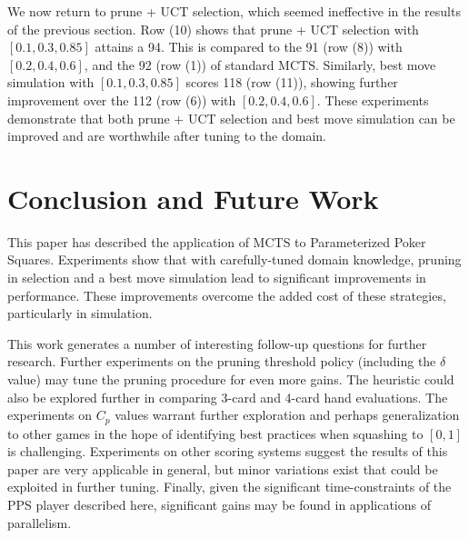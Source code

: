 \documentclass[letterpaper]{article}
\begin{document}
We now return to prune + UCT selection, which seemed ineffective in the results of the previous section. Row (10) shows that prune + UCT selection with $[0.1, 0.3, 0.85]$ attains a 94. This is compared to the 91 (row (8)) with $[0.2, 0.4, 0.6]$, and the 92 (row (1)) of standard MCTS. Similarly, best move simulation with $[0.1, 0.3, 0.85]$ scores 118 (row (11)), showing further improvement over the 112 (row (6)) with $[0.2, 0.4, 0.6]$. These experiments demonstrate that both prune + UCT selection and best move simulation can be improved and are worthwhile after tuning to the domain.




\section{Conclusion and Future Work}

This paper has described the application of MCTS to Parameterized Poker Squares. Experiments show that with carefully-tuned domain knowledge, pruning in selection and a best move simulation lead to significant improvements in performance. These improvements overcome the added cost of these strategies, particularly in simulation.

This work generates a number of interesting follow-up questions for further research. Further experiments on the pruning threshold policy (including the $\delta$ value) may tune the pruning procedure for even more gains. The heuristic could also be explored further in comparing 3-card and 4-card hand evaluations. The experiments on $C_p$ values warrant further exploration and perhaps generalization to other games in the hope of identifying best practices when squashing to $[0,1]$ is challenging. Experiments on other scoring systems suggest the results of this paper are very applicable in general, but minor variations exist that could be exploited in further tuning. Finally, given the significant time-constraints of the PPS player described here, significant gains may be found in applications of parallelism.



\end{document}
